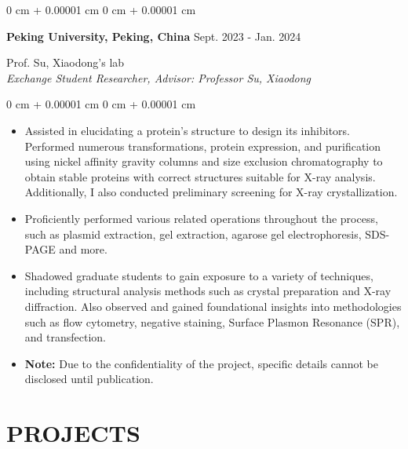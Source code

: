 \documentclass[10pt, letterpaper]{article}
\newenvironment{highlights}{
    \begin{itemize}[
        topsep=0.10 cm,
        parsep=0.10 cm,
        partopsep=0pt,
        itemsep=0pt,
        leftmargin=0 cm + 10pt
    ]
}{
    \end{itemize}
} %
\newenvironment{onecolentry}{
    \begin{adjustwidth}{
        0 cm + 0.00001 cm
    }{
        0 cm + 0.00001 cm
    }
}{
    \end{adjustwidth}
} %
\newenvironment{twocolentry}[2][]{
    \onecolentry
    \def\secondColumn{#2}
    \setcolumnwidth{\fill, 4.5 cm}
    \begin{paracol}{2}
}{
    \switchcolumn \raggedleft \secondColumn
    \end{paracol}
    \endonecolentry
} %
\begin{document}
        
      \begin{twocolentry}{
            \normalsize Sept. 2023 - Jan. 2024
        }{
           {\setlength{\fontsize}{10.7pt}{14pt}\selectfont \textbf{Peking University, Peking, China}}}\end{twocolentry}
\vspace{0.1 cm}
           \normalsize {Prof. Su, Xiaodong's lab}\\
\vspace{0.1 cm}
        \emph{Exchange Student Researcher, Advisor: Professor Su, Xiaodong}
\vspace{0.1 cm}
        \begin{onecolentry}
            \begin{highlights}
                \item Assisted in elucidating a protein's structure to design its inhibitors. Performed numerous transformations, protein expression, and purification using nickel affinity gravity columns and size exclusion chromatography to obtain stable proteins with correct structures suitable for X-ray analysis. Additionally, I also conducted preliminary screening for X-ray crystallization.
                \item Proficiently performed various related operations throughout the process, such as plasmid extraction, gel extraction, agarose gel electrophoresis, SDS-PAGE and more.
                \item Shadowed graduate students to gain exposure to a variety of techniques, including structural analysis methods such as crystal preparation and X-ray diffraction. Also observed and gained foundational insights into methodologies such as flow cytometry, negative staining, Surface Plasmon Resonance (SPR), and transfection.
                \item \textbf{Note:} Due to the confidentiality of the project, specific details cannot be disclosed until publication.
            \end{highlights}
        \end{onecolentry}



    
    \section{PROJECTS}
\end{document}
